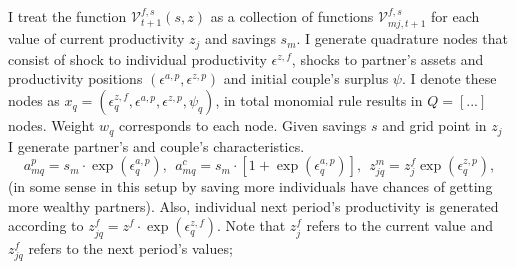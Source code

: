 I treat the function $\mathcal{V}^{f,s}_{t+1}(s,z)$ as a collection of functions $\mathcal{V}^{f,s}_{mj,t+1}$ for each value of current productivity $z_j$ and savings $s_m$. I generate quadrature nodes that consist of shock to individual productivity $\epsilon^{z,f}$, shocks to partner's assets and productivity positions
$(\epsilon^{a,p},\epsilon^{z,p})$ and initial couple's surplus $\psi$. I denote these nodes as $x_q = (\epsilon^{z,f}_q,\epsilon^{a,p},\epsilon^{z,p},\psi_q)$, in total monomial rule results in $Q = [...]$ nodes. Weight $w_q$ corresponds to each node. Given savings $s$ and grid point in $z_j$ I generate partner's and couple's characteristics. 
\[a^p_{mq} = s_m\cdot \exp(\epsilon^{a,p}_q), \ \ a^c_{mq} = s_m\cdot [1 + \exp(\epsilon^{a,p}_q)], \ \ z^m_{jq} = z^f_j \exp(\epsilon^{z,p}_q),\]
(in some sense in this setup by saving more individuals have chances of getting more wealthy partners).  Also, individual next period's productivity is generated according to $z^f_{jq} = z^f\cdot \exp(\epsilon^{z,f}_q)$. Note that $z^f_j$ refers to the current value and $z^f_{jq}$ refers to the next period's values;

